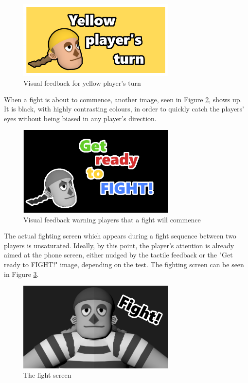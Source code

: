 \begin{figure}[h!]
	\centering
	\includegraphics[width=0.7\textwidth]{figures/yellowturn.png}
	\caption{Visual feedback for yellow player's turn}
	\label{fig:yellow_turn}
\end{figure}

When a fight is about to commence, another image, seen in Figure \ref{fig:get_ready}, shows up. It is black, with highly contrasting colours, in order to quickly catch the players' eyes without being biased in any player's direction.

\begin{figure}[h!]
	\centering
	\includegraphics[width=0.7\textwidth]{figures/getready.png}
	\caption{Visual feedback warning players that a fight will commence}
	\label{fig:get_ready}
\end{figure}

The actual fighting screen which appears during a fight sequence between two players is unsaturated. Ideally, by this point, the player's attention is already aimed at the phone screen, either nudged by the tactile feedback or the "Get ready to FIGHT!" image, depending on the test. The fighting screen can be seen in Figure \ref{fig:fight}.

\begin{figure}[h!]
	\centering
	\includegraphics[width=0.7\textwidth]{figures/fight.png}
	\caption{The fight screen}
	\label{fig:fight}
\end{figure}

